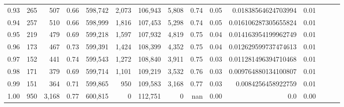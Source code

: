 \begin{tabular}{rrrrrrrrrrrrrrr}
0.93 &     265 &    507 &  0.66 &  598,742 &    2,073 &  106,943 &    5,808 &  0.74 &  0.05 &   0.01838564624703994 &      0.01 \\
0.94 &     257 &    510 &  0.66 &  598,999 &    1,816 &  107,453 &    5,298 &  0.74 &  0.05 &  0.016106287305655824 &      0.01 \\
0.95 &     219 &    479 &  0.69 &  599,218 &    1,597 &  107,932 &    4,819 &  0.75 &  0.04 &  0.014163954199962749 &      0.01 \\
0.96 &     173 &    467 &  0.73 &  599,391 &    1,424 &  108,399 &    4,352 &  0.75 &  0.04 &  0.012629599737474613 &      0.01 \\
0.97 &     152 &    441 &  0.74 &  599,543 &    1,272 &  108,840 &    3,911 &  0.75 &  0.03 &  0.011281496394710468 &      0.01 \\
0.98 &     171 &    379 &  0.69 &  599,714 &    1,101 &  109,219 &    3,532 &  0.76 &  0.03 &  0.009764880134100807 &      0.01 \\
0.99 &     151 &    364 &  0.71 &  599,865 &      950 &  109,583 &    3,168 &  0.77 &  0.03 &    0.0084256458922759 &      0.01 \\
1.00 &     950 &  3,168 &  0.77 &  600,815 &        0 &  112,751 &        0 &   nan &  0.00 &                   0.0 &      0.00 \\
\bottomrule
\end{tabular}
